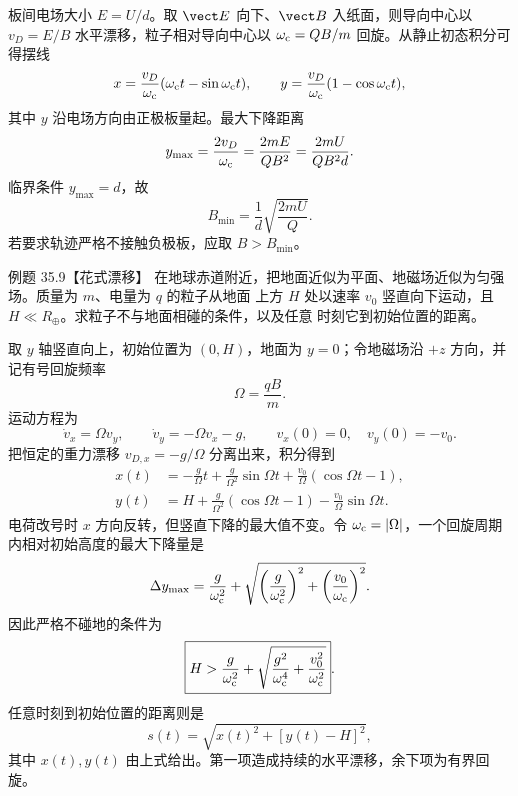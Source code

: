 \begin{xesolution}
板间电场大小 $E=U/d$。取 $\vect E$ 向下、$\vect B$ 入纸面，则导向中心以
$v_D=E/B$ 水平漂移，粒子相对导向中心以 $\omega_{\rm c}=QB/m$ 回旋。从静止初态积分可得摆线
\[
  x=\frac{v_D}{\omega_{\rm c}}(\omega_{\rm c}t-\sin\omega_{\rm c}t),
  \qquad
  y=\frac{v_D}{\omega_{\rm c}}(1-\cos\omega_{\rm c}t),
\]
其中 $y$ 沿电场方向由正极板量起。最大下降距离
\begin{equation}
  y_{\max}=\frac{2v_D}{\omega_{\rm c}}
  =\frac{2mE}{QB^2}=\frac{2mU}{QB^2d}.
\end{equation}
临界条件 $y_{\max}=d$，故
\begin{equation}
  \boxed{B_{\min}=\frac1d\sqrt{\frac{2mU}{Q}}}.
\end{equation}
若要求轨迹严格不接触负极板，应取 $B>B_{\min}$。

\crossedFieldCycloidDiagram
\end{xesolution}

\Needspace{0.46\textheight}
\begin{origexamplebox}{例题 35.9【花式漂移】}
在地球赤道附近，把地面近似为平面、地磁场近似为匀强场。质量为 $m$、电量为 $q$ 的粒子从地面
上方 $H$ 处以速率 $v_0$ 竖直向下运动，且 $H\ll R_\oplus$。求粒子不与地面相碰的条件，以及任意
时刻它到初始位置的距离。
\end{origexamplebox}

\begin{xesolution}
取 $y$ 轴竖直向上，初始位置为 $(0,H)$，地面为 $y=0$；令地磁场沿 $+z$ 方向，并记有号回旋频率
\[
  \Omega=\frac{qB}{m}.
\]
运动方程为
\[
  \dot v_x=\Omega v_y,
  \qquad
  \dot v_y=-\Omega v_x-g,
  \qquad v_x(0)=0,\quad v_y(0)=-v_0.
\]
把恒定的重力漂移 $v_{D,x}=-g/\Omega$ 分离出来，积分得到
\begin{align}
  x(t)&=-\frac g\Omega t+\frac g{\Omega^2}\sin\Omega t
       +\frac{v_0}{\Omega}(\cos\Omega t-1),\\
  y(t)&=H+\frac g{\Omega^2}(\cos\Omega t-1)
       -\frac{v_0}{\Omega}\sin\Omega t.
\end{align}
电荷改号时 $x$ 方向反转，但竖直下降的最大值不变。令
$\omega_{\rm c}=|\Omega|$，一个回旋周期内相对初始高度的最大下降量是
\begin{equation}
  \Delta y_{\max}=\frac g{\omega_{\rm c}^2}
  +\sqrt{\left(\frac g{\omega_{\rm c}^2}\right)^2
  +\left(\frac{v_0}{\omega_{\rm c}}\right)^2}.
\end{equation}
因此严格不碰地的条件为
\begin{equation}
  \boxed{H>\frac g{\omega_{\rm c}^2}
  +\sqrt{\frac{g^2}{\omega_{\rm c}^4}+\frac{v_0^2}{\omega_{\rm c}^2}}}.
\end{equation}
任意时刻到初始位置的距离则是
\begin{equation}
  \boxed{s(t)=\sqrt{x(t)^2+[y(t)-H]^2}},
\end{equation}
其中 $x(t),y(t)$ 由上式给出。第一项造成持续的水平漂移，余下项为有界回旋。

\gravityDriftDiagram
\end{xesolution}


